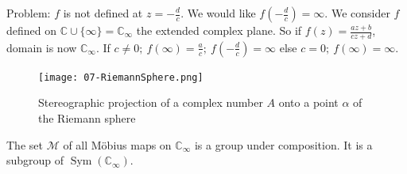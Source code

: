 Problem: $f$ is not defined at $z = - \frac{d}{c}$.
We would like $f(-\frac{d}{c}) = \infty$.
We consider $f$ defined on $\mathbb{C} \cup \{ \infty \} = \mathbb{C}_\infty$ the extended complex plane.
So if $f(z) = \frac{az + b}{cz + d}$, domain is now $\mathbb{C}_\infty$.
If $c \neq 0;\ f(\infty) = \frac{a}{c};\ f(-\frac{d}{c}) = \infty$ else $c = 0;\ f(\infty) = \infty$.

\begin{figure}
    \centering
    \texttt{[image: 07-RiemannSphere.png]}
    \caption{Stereographic projection of a complex number $A$ onto a point $\alpha$ of the Riemann sphere}
\end{figure} 

\begin{theorem}\label{thm:14}
    The set $\mathcal{M}$ of all M\"obius maps on $\mathbb{C}_\infty$ is a group under composition.
    It is a subgroup of $\operatorname{Sym}(\mathbb{C}_\infty)$.
\end{theorem} 


